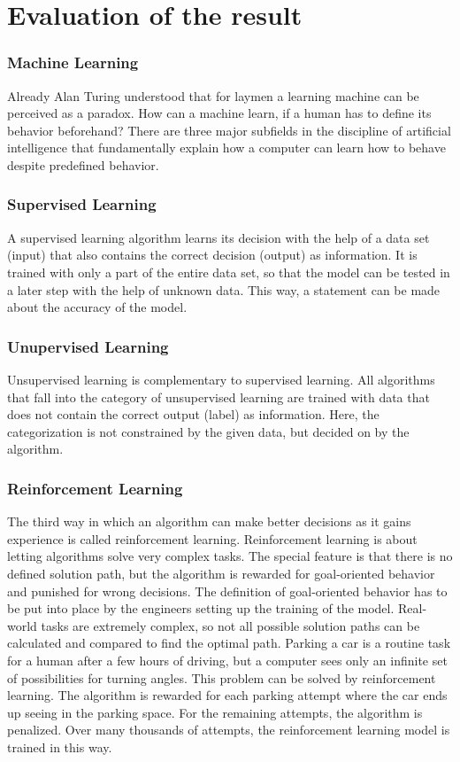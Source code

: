 \chapter{Evaluation of the result}
\subsection{Machine Learning}
Already Alan Turing understood that for laymen a learning machine can be perceived as a paradox.  How can a machine learn, if a human has to define its behavior beforehand? There are three major subfields in the discipline of artificial intelligence that fundamentally explain how a computer can learn how to behave despite predefined behavior.

\subsection{Supervised Learning}
A supervised learning algorithm learns its decision with the help of a data set (input) that also contains the correct decision (output) as information. It is trained with only a part of the entire data set, so that the model can be tested in a later step with the help of unknown data. This way, a statement can be made about the accuracy of the model.

\subsection{Unupervised Learning}
Unsupervised learning is complementary to supervised learning. All algorithms that fall into the category of unsupervised learning are trained with data that does not contain the correct output (label) as information. Here, the categorization is not constrained by the given data, but decided on by the algorithm.

\subsection{Reinforcement Learning}
The third way in which an algorithm can make better decisions as it gains experience is called reinforcement learning. Reinforcement learning is about letting algorithms solve very complex tasks. The special feature is that there is no defined solution path, but the algorithm is rewarded for goal-oriented behavior and punished for wrong decisions. The definition of goal-oriented behavior has to be put into place by the engineers setting up the training of the model. Real-world tasks are extremely complex, so not all possible solution paths can be calculated and compared to find the optimal path. Parking a car is a routine task for a human after a few hours of driving, but a computer sees only an infinite set of possibilities for turning angles. This problem can be solved by reinforcement learning. The algorithm is rewarded for each parking attempt where the car ends up seeing in the parking space. For the remaining attempts, the algorithm is penalized. Over many thousands of attempts, the reinforcement learning model is trained in this way.

